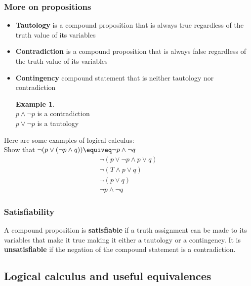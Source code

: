 \documentclass{article}
\theoremstyle{definition}
\newtheorem{example}{Example}
\numberwithin{equation}{subsection}
\numberwithin{remark}{subsection}
\begin{document}
\subsubsection{More on propositions}

\begin{tcolorbox}
\begin{itemize}
    \item \textbf{Tautology} is a compound proposition that is always true regardless of the truth value of its variables
    \item \textbf{Contradiction} is a compound proposition that is always false regardless of the truth value of its variables 
    \item \textbf{Contingency} compound statement that is neither tautology nor contradiction
    
    \begin{example}
    \\
    $p \land \neg p$ is a contradiction
    \\
    $p \lor \neg p$ is a tautology
    \end{example}
\end{itemize}
\end{tcolorbox}

Here are some examples of logical calculus:
\\
Show that $\neg(p \lor (\neg p \land q )) \equiveq \neg p \land \neg q$
\begin{align*}
    \neg(p\lor\neg p \land p \lor q)\\
    \neg(T \land p \lor q)\\
    \neg(p \lor q)\\
    \neg p \land \neg q
\end{align*}

\subsubsection{Satisfiability}

A compound proposition is \textbf{satisfiable} if a truth assignment can be made to its variables that make it true making it either a tautology or a contingency. It is \textbf{unsatisfiable} if the negation of the compound statement is a contradiction. 

\subsection{Logical calculus and useful equivalences}
\end{document}
